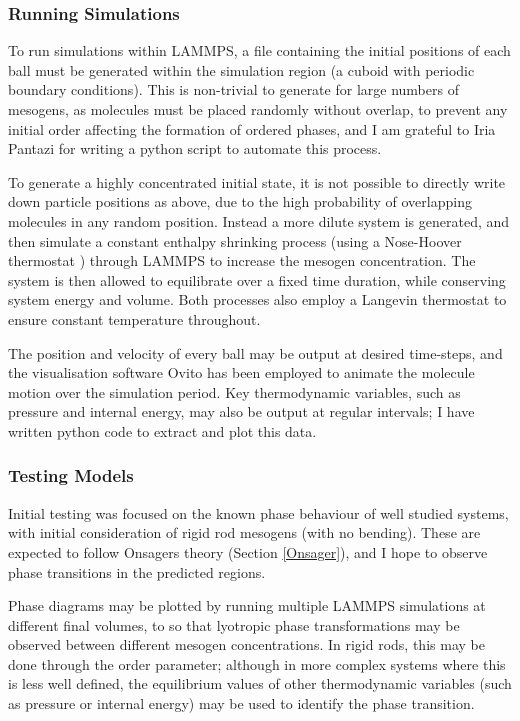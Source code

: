 \documentclass[11pt, a4paper]{article} %
\begin{document}

\subsubsection{Running Simulations}
To run simulations within LAMMPS, a file containing the initial positions of each ball must be generated within the simulation region (a cuboid with periodic boundary conditions). This is non-trivial to generate for large numbers of mesogens, as molecules must be placed randomly without overlap, to prevent any initial order affecting the formation of ordered phases, and I am grateful to Iria Pantazi for writing a python script to automate this process. 

To generate a highly concentrated initial state, it is not possible to directly write down particle positions as above, due to the high probability of overlapping molecules in any random position. Instead a more dilute system is generated, and then simulate a constant enthalpy shrinking process (using a Nose-Hoover thermostat \cite{Shinoda2004}) through LAMMPS to increase the mesogen concentration. The system is then allowed to equilibrate over a fixed time duration, while conserving system energy and volume. Both processes also employ a Langevin thermostat to ensure constant temperature throughout.

The position and velocity of every ball may be output at desired time-steps, and the visualisation software Ovito \cite{Ovito} has been employed to animate the molecule motion over the simulation period. Key thermodynamic variables, such as pressure and internal energy, may also be output at regular intervals; I have written python code to extract and plot this data.

\subsubsection{Testing Models}
Initial testing was focused on the known phase behaviour of well studied systems, with initial consideration of rigid rod mesogens (with no bending). These are expected to follow Onsagers theory (Section \ref{Onsager}), and I hope to observe phase transitions in the predicted regions.

Phase diagrams may be plotted by running multiple LAMMPS simulations at different final volumes, to so that lyotropic phase transformations may be observed between different mesogen concentrations. In rigid rods, this may be done through the order parameter; although in more complex systems where this is less well defined, the equilibrium values of other thermodynamic variables (such as pressure or internal energy) may be used to identify the phase transition.
\end{document}
